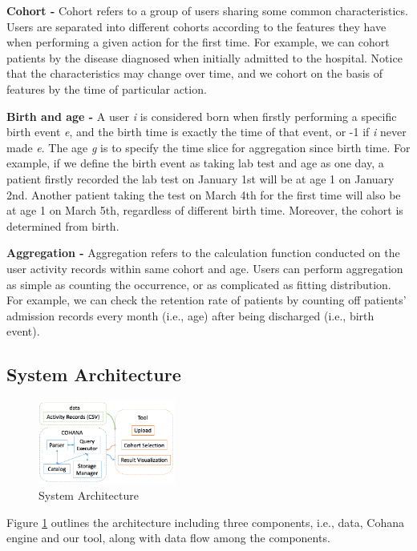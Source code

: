 \documentclass[10pt,conference,letterpaper]{IEEEtran}
\begin{document}
\textbf{Cohort -} Cohort refers to a group of users sharing some common characteristics. Users are separated into different cohorts according to the features they have when performing a given action for the first time. For example, we can cohort patients by the disease diagnosed when initially admitted to the hospital. Notice that the characteristics may change over time, and we cohort on the basis of features by the time of particular action.

\textbf{Birth and age -} A user \emph{i} is considered born when firstly performing a specific birth event \emph{e}, and the birth time is exactly the time of that event, or -1 if \emph{i} never made \emph{e}. The age \emph{g} is to specify the time slice for aggregation since birth time. For example, if we define the birth event as taking lab test and age as one day, a patient firstly recorded the lab test on January 1st will be at age 1 on January 2nd. Another patient taking the test on March 4th for the first time will also be at age 1 on March 5th, regardless of different birth time. Moreover, the cohort is determined from birth.

\textbf{Aggregation -} Aggregation refers to the calculation function conducted on the user activity records within same cohort and age. Users can perform aggregation as simple as counting the occurrence, or as complicated as fitting distribution. For example, we can check the retention rate of patients by counting off patients' admission records every month (i.e., age) after being discharged (i.e., birth event).

\subsection{System Architecture}

\begin{figure}
    \centering
    \includegraphics[width=0.4\textwidth]{arch_tool.png}
    \caption{System Architecture}
    \label{fig:sys_arch}
\end{figure}

Figure \ref{fig:sys_arch} outlines the architecture including three components, i.e., data, Cohana engine and our tool, along with data flow among the components.
\end{document}
